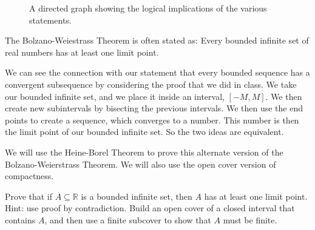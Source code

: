 \documentclass[10pt]{article}
\theoremstyle{definition}
\begin{document}
\begin{enumerate}
\begin{figure}[h]
\begin{center}
\begin{tikzpicture}
	\end{tikzpicture}
	\caption{A directed graph showing the logical implications of the various statements.}\label{fig:theorems}
	\end{center}
	\end{figure}
	
	
The Bolzano-Weiestrass Theorem is often stated as: Every bounded infinite set of real numbers has at least one limit point.

We can see the connection with our statement that every bounded sequence has a convergent subsequence by considering the proof that we did in class.  We take our bounded infinite set, and we place it inside an interval, $[-M,M]$.  We then create new subintervals by bisecting the previous intervals.  We then use the end points to create a sequence, which converges to a number.  This number is then the limit point of our bounded infinite set.  So the two ideas are equivalent.

We will use the Heine-Borel Theorem to prove this alternate version of the Bolzano-Weierstrass Theorem.  We will also use the open cover version of compactness.

Prove that if $A \subseteq \mathbb{R}$ is a bounded infinite set, then $A$ has at least one limit point.  Hint: use proof by contradiction.  Build an open cover of a closed interval that contains $A$, and then use a finite subcover to show that $A$ must be finite.

	

\end{enumerate}
\end{document}
